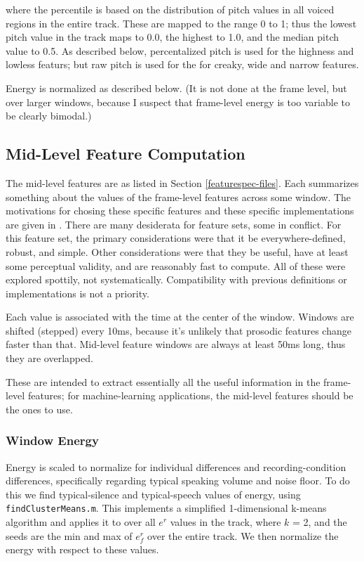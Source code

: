 \documentclass[11pt]{article}
\begin{document}
where the percentile is based on the distribution of pitch values in
all voiced regions in the entire track.  These are mapped to the range
0 to 1; thus the lowest pitch value in the track maps to 0.0, the
highest to 1.0, and the median pitch value to 0.5.  As described
below, percentalized pitch is used for the highness and lowless
featurs; but raw pitch is used for the for creaky, wide and narrow
features.

Energy is normalized as described below. (It is not done at the frame
level, but over larger windows, because I suspect that frame-level
energy is too variable to be clearly bimodal.)


\subsection{Mid-Level Feature Computation}   \label{other-features}

The mid-level features are as listed in Section
\ref{featurespec-files}.  Each summarizes something about the values
of the frame-level features across some window.  The motivations for
chosing these specific features and these specific implementations are
given in \cite{mid-level-features}.  There are many desiderata for
feature sets, some in conflict.  For this feature set, the primary
considerations were that it be everywhere-defined, robust, and simple.
Other considerations were that they be useful, have at least some
perceptual validity, and are reasonably fast to compute.  All of these
were explored spottily, not systematically.  Compatibility with
previous definitions or implementations is not a priority.

Each value is associated with the time at the center of the window.
Windows are shifted (stepped) every 10ms, because it's unlikely that
prosodic features change faster than that.  Mid-level feature windows
are always at least 50ms long, thus they are overlapped.

These are intended to extract essentially all the useful information
in the frame-level features; for machine-learning applications, the
mid-level features should be the ones to use. 


\subsubsection{Window Energy}

Energy is scaled to normalize for individual differences and
recording-condition differences, specifically regarding typical
speaking volume and noise floor.  To do this we find typical-silence
and typical-speech values of energy, using {\tt findClusterMeans.m}.
This implements a simplified 1-dimensional k-means algorithm and
applies it to over all $e^r$ values in the track, where $k$ = 2, and
the seeds are the min and max of $e_f^r$ over the entire track.  We
then normalize the energy with respect to these values.
\end{document}
